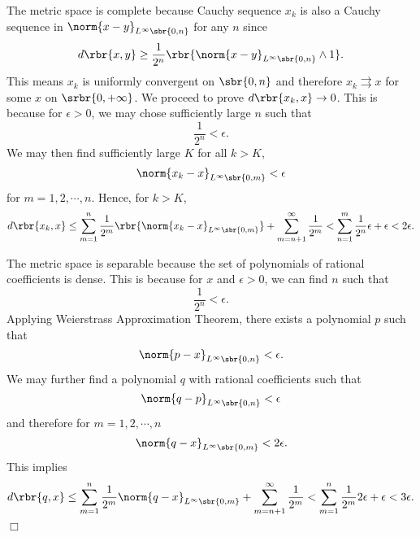 \documentclass[english, nochinese]{pnote}
\begin{document}
The metric space is complete because Cauchy sequence $x_k$ is also a Cauchy sequence in $ \norm{ x - y }_{ L^{\infty} \sbr{ 0, n } } $ for any $n$ since
\begin{equation}
d \rbr{ x, y } \ge \frac{1}{2^n} \rbr{ \norm{ x - y }_{ L^{\infty} \sbr{ 0, n } } \wedge 1 }.
\end{equation}
This means $x_k$ is uniformly convergent on $ \sbr{ 0, n } $ and therefore $ x_k \rightrightarrows x $ for some $x$ on $ \srbr{ 0, +\infty } $.
We proceed to prove $ d \rbr{ x_k, x } \rightarrow 0 $. This is because for $ \epsilon > 0 $, we may chose sufficiently large $n$ such that
\begin{equation}
\frac{1}{2^n} < \epsilon.
\end{equation}
We may then find sufficiently large $K$ for all $ k > K $,
\begin{equation}
\norm{ x_k - x }_{ L^{\infty} \sbr{ 0, m } } < \epsilon
\end{equation}
for $ m = 1, 2, \cdots, n $. Hence, for $ k > K $,
\begin{equation}
d \rbr{ x_k, x } \le \sum_{ m = 1 }^n \frac{1}{2^m} \rbr{ \norm{ x_k - x }_{ L^{\infty} \sbr{ 0, m } } } + \sum_{ m = n + 1 }^{\infty} \frac{1}{2^m} < \sum_{ n = 1 }^m \frac{1}{2^n} \epsilon + \epsilon < 2 \epsilon.
\end{equation}

The metric space is separable because the set of polynomials of rational coefficients is dense. This is because for $x$ and $ \epsilon > 0 $, we can find $n$ such that
\begin{equation}
\frac{1}{2^n} < \epsilon.
\end{equation}
Applying Weierstrass Approximation Theorem, there exists a polynomial $p$ such that
\begin{equation}
\norm{ p - x }_{ L^{\infty} \sbr{ 0, n } } < \epsilon.
\end{equation}
We may further find a polynomial $q$ with rational coefficients such that
\begin{equation}
\norm{ q - p }_{ L^{\infty} \sbr{ 0, n } } < \epsilon
\end{equation}
and therefore for $ m = 1, 2, \cdots, n $
\begin{equation}
\norm{ q - x }_{ L^{\infty} \sbr{ 0, m } } < 2 \epsilon.
\end{equation}
This implies
\begin{equation}
d \rbr{ q, x } \le \sum_{ m = 1 }^n \frac{1}{2^m} \norm{ q - x }_{ L^{\infty} \sbr{ 0, m } } + \sum_{ m = n + 1 }^{\infty} \frac{1}{2^m} < \sum_{ m = 1 }^n \frac{1}{2^m} 2 \epsilon + \epsilon < 3 \epsilon.
\end{equation}
\hfill$\Box$
\end{document}
